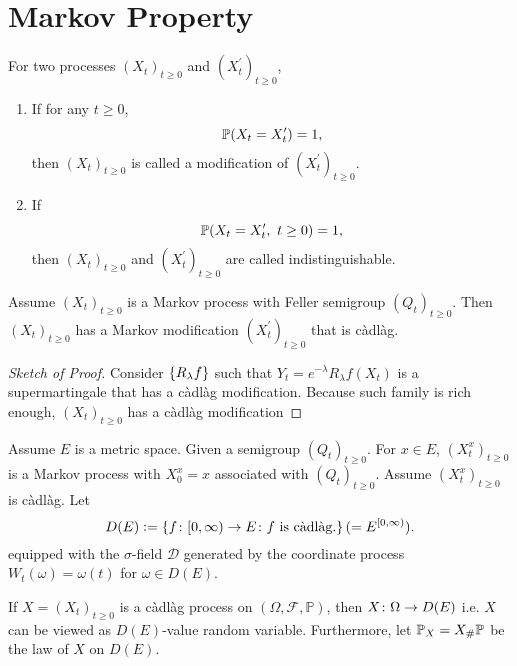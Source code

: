 \section{Markov Property}

\begin{defn}
    For two processes $(X_t)_{t \geq 0}$ and $(X_t^\prime)_{t \geq 0}$,
    \begin{enumerate}[label=(\arabic{*})]
        \item If for any $t \geq 0$,
        \begin{equation*}
            \mathbb{P}(X_t = X_t^\prime) = 1,
        \end{equation*}
        then $(X_t)_{t \geq 0}$ is called a modification of $(X_t^\prime)_{t \geq 0}$.
        \item If 
        \begin{equation*}
            \mathbb{P}(X_t = X_t^\prime,~t\geq 0) = 1,
        \end{equation*}
        then $(X_t)_{t \geq 0}$ and $(X_t^\prime)_{t \geq 0}$ are called indistinguishable.
    \end{enumerate}
\end{defn}

\begin{thm}
    Assume $(X_t)_{t \geq 0}$ is a Markov process with Feller semigroup $(Q_t)_{t \geq 0}$. Then $(X_t)_{t \geq 0}$ has a Markov modification $(X_t^\prime)_{t \geq 0}$ that is c\`adl\`ag.
\end{thm}
\begin{proof}[Sketch of Proof]
    Consider $\left\{R_\lambda f\right\}$ such that $Y_t = e^{-\lambda}R_\lambda f(X_t)$ is a supermartingale that has a c\`adl\`ag modification. Because such family is rich enough, $(X_t)_{t \geq 0}$ has a c\`adl\`ag modification
\end{proof}

\noindent Assume $E$ is a metric space. Given a semigroup $(Q_t)_{t \geq 0}$. For $x \in E$, $(X^x_t)_{t \geq 0}$ is a Markov process with $X_0^x = x$ associated with $(Q_t)_{t \geq 0}$. Assume $(X^x_t)_{t \geq 0}$ is c\`adl\`ag. Let
\begin{equation*}
    D(E) \vcentcolon= \left\{f \colon [0,\infty) \rightarrow E \colon f \text{ is c\`adl\`ag.}\right\} ( = E^{[0,\infty)} ).
\end{equation*}
equipped with the $\sigma$-field $\mathcal{D}$ generated by the coordinate process $W_t(\omega) = \omega (t)$ for $\omega \in D(E)$.
\begin{rmk}
    If $X=(X_t)_{t \geq 0}$ is a c\`adl\`ag process on $(\Omega, \mathcal{F},\mathbb{P})$, then $X \colon \Omega \rightarrow D(E)$ i.e. $X$ can be viewed as $D(E)$-value random variable. Furthermore, let $\mathbb{P}_X = X_{\#}\mathbb{P}$ be the law of $X$ on $D(E)$.
\end{rmk}

